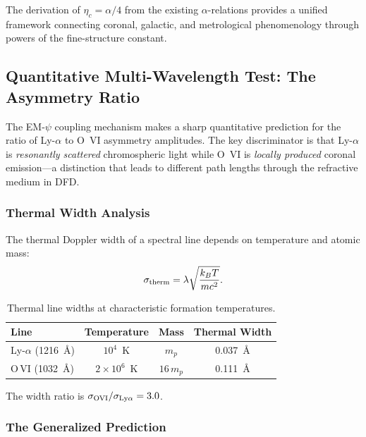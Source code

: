 The derivation of $\eta_c = \alpha/4$ from the existing $\alpha$-relations provides 
a unified framework connecting coronal, galactic, and metrological phenomenology 
through powers of the fine-structure constant.

\subsection{Quantitative Multi-Wavelength Test: The Asymmetry Ratio}\label{sec:uvcs-ratio}

The EM-$\psi$ coupling mechanism makes a sharp quantitative prediction for the ratio 
of Ly-$\alpha$ to O~VI asymmetry amplitudes. The key discriminator is that Ly-$\alpha$ 
is \emph{resonantly scattered} chromospheric light while O~VI is \emph{locally produced} 
coronal emission---a distinction that leads to different path lengths through the 
refractive medium in DFD.

\subsubsection{Thermal Width Analysis}

The thermal Doppler width of a spectral line depends on temperature and atomic mass:
\begin{equation}
\sigma_{\rm therm} = \lambda \sqrt{\frac{k_B T}{m c^2}}.
\end{equation}

\begin{table}[h]
\centering
\caption{Thermal line widths at characteristic formation temperatures.}\label{tab:linewidths}
\begin{ruledtabular}
\begin{tabular}{lccc}
Line & Temperature & Mass & Thermal Width \\
\hline
Ly-$\alpha$ (1216~\AA) & $10^4$~K & $m_p$ & 0.037~\AA \\
O\,VI (1032~\AA) & $2\times10^6$~K & $16\,m_p$ & 0.111~\AA \\
\end{tabular}
\end{ruledtabular}
\end{table}

The width ratio is $\sigma_{\rm OVI}/\sigma_{\rm Ly\alpha} = 3.0$.

\subsubsection{The Generalized Prediction}

